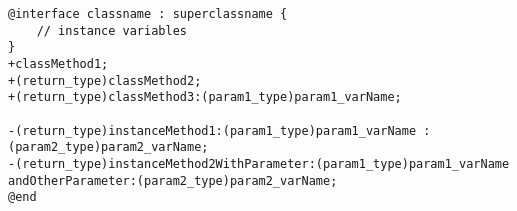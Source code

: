 \documentclass{article}
\begin{document}
\begin{verbatim}
@interface classname : superclassname {
    // instance variables
}
+classMethod1;
+(return_type)classMethod2;
+(return_type)classMethod3:(param1_type)param1_varName;

-(return_type)instanceMethod1:(param1_type)param1_varName :(param2_type)param2_varName;
-(return_type)instanceMethod2WithParameter:(param1_type)param1_varName andOtherParameter:(param2_type)param2_varName;
@end
\end{verbatim}
\end{document}
